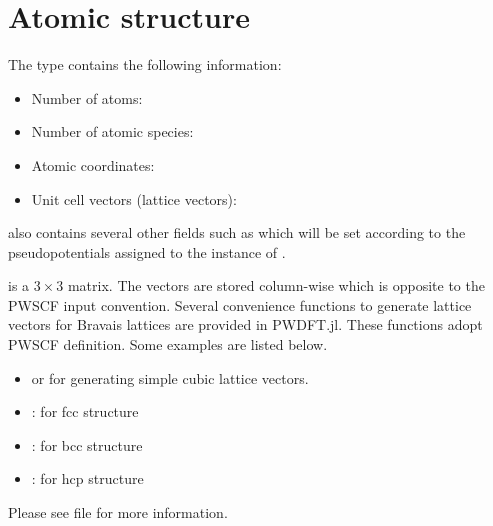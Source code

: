 \section{Atomic structure}
%
The type  contains the following information:
%
\begin{itemize}
\item Number of atoms: 
\item Number of atomic species: 
\item Atomic coordinates: 
\item Unit cell vectors (lattice vectors): 
\end{itemize}
%
 also contains several other fields such as 
which will be set according to the pseudopotentials assigned to
the instance of .



 is a $3\times3$ matrix. The vectors are stored column-wise which is
opposite to the PWSCF input convention.
Several convenience functions to generate lattice vectors for Bravais lattices
are provided in \textsf{PWDFT.jl}. These functions adopt PWSCF definition. Some examples
are listed below.
\begin{itemize}
\item {} or  for generating
simple cubic lattice vectors.
\item {}: for fcc structure
\item {}: for bcc structure
\item {}: for hcp structure
\end{itemize}
Please see file  for more information.



